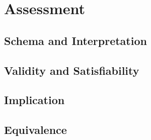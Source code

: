 \section{Assessment}

\subsection{Schema and Interpretation}

\subsection{Validity and Satisfiability}

\subsection{Implication}

\subsection{Equivalence}
